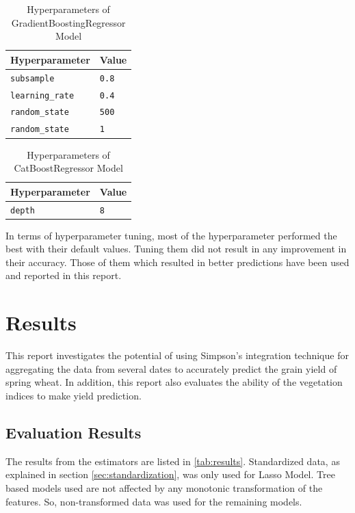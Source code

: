 \documentclass[sigconf, nonacm, natbib, screen, balance=False]{acmart}
\begin{document}
\begin{table}[h!]
      \caption{Hyperparameters of GradientBoostingRegressor Model}
  \label{tab:gbr}
  \begin{tabular}{ll}
    \hline
    Hyperparameter & Value \\\hline
    \verb!subsample! & \verb!0.8! \\
    \verb!learning_rate! & \verb!0.4! \\
    \verb!random_state! & \verb!500! \\
    \verb!random_state! & \verb!1! \\ \hline
  \end{tabular}
\end{table}

\begin{table}[h!]
      \caption{Hyperparameters of CatBoostRegressor Model}
  \label{tab:catbr}
  \begin{tabular}{ll}
    \hline
    Hyperparameter & Value \\\hline
    \verb!depth! & \verb!8! \\ \hline
  \end{tabular}
\end{table}

In terms of hyperparameter tuning, most of the hyperparameter performed the best with their default values. Tuning them did not result in any improvement in their accuracy. Those of them which resulted in better predictions have been used and reported in this report.



\section{Results}\label{sec:results}

This report investigates the potential of using Simpson's integration technique for aggregating the data from several dates to accurately predict the grain yield of spring wheat. In addition, this report also evaluates the ability of the vegetation indices to make yield prediction.


\subsection{Evaluation Results}\label{sec:ev_results}

The results from the estimators are listed in \ref{tab:results}. Standardized data, as explained in section \ref{sec:standardization}, was only used for Lasso Model. Tree based models used are not affected by any monotonic transformation of the features. So, non-transformed data was used for the remaining models.
\end{document}
